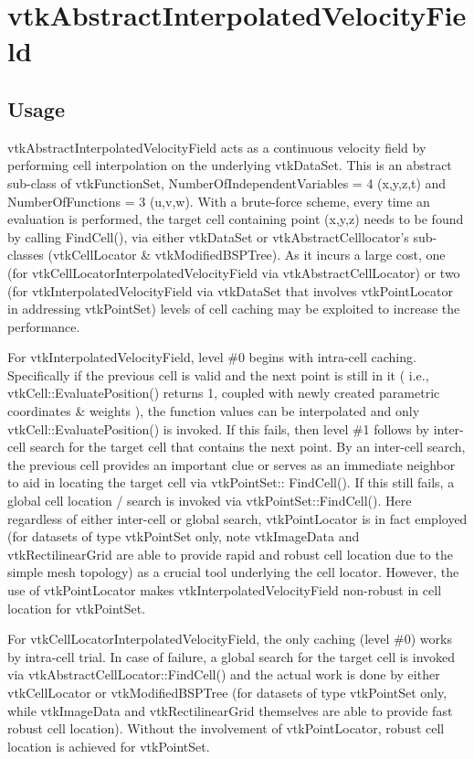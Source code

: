 \section{vtkAbstractInterpolatedVelocityField}

\subsection{Usage}

  vtkAbstractInterpolatedVelocityField acts as a continuous velocity field
  by performing cell interpolation on the underlying vtkDataSet. This is an
  abstract sub-class of vtkFunctionSet, NumberOfIndependentVariables = 4
  (x,y,z,t) and NumberOfFunctions = 3 (u,v,w). With a brute-force scheme,
  every time an evaluation is performed, the target cell containing point 
  (x,y,z) needs to be found by calling FindCell(), via either vtkDataSet or
  vtkAbstractCelllocator's sub-classes (vtkCellLocator \& vtkModifiedBSPTree). 
  As it incurs a large cost, one (for vtkCellLocatorInterpolatedVelocityField
  via vtkAbstractCellLocator) or two (for vtkInterpolatedVelocityField via 
  vtkDataSet that involves vtkPointLocator in addressing vtkPointSet) levels
  of cell caching may be exploited to increase the performance.

  For vtkInterpolatedVelocityField, level \#0 begins with intra-cell caching. 
  Specifically if the previous cell is valid and the next point is still in
  it ( i.e., vtkCell::EvaluatePosition() returns 1, coupled with newly created 
  parametric coordinates \& weights ), the function values can be interpolated
  and only vtkCell::EvaluatePosition() is invoked. If this fails, then level \#1 
  follows by inter-cell search for the target cell that contains the next point. 
  By an inter-cell search, the previous cell provides an important clue or serves 
  as an immediate neighbor to aid in locating the target cell via vtkPointSet::
  FindCell(). If this still fails, a global cell location / search is invoked via
  vtkPointSet::FindCell(). Here regardless of either inter-cell or global search, 
  vtkPointLocator is in fact employed (for datasets of type vtkPointSet only, note
  vtkImageData and vtkRectilinearGrid are able to provide rapid and robust cell 
  location due to the simple mesh topology) as a crucial tool underlying the cell 
  locator. However, the use of vtkPointLocator makes vtkInterpolatedVelocityField 
  non-robust in cell location for vtkPointSet.
  
  For vtkCellLocatorInterpolatedVelocityField, the only caching (level \#0) works
  by intra-cell trial. In case of failure, a global search for the target cell is 
  invoked via vtkAbstractCellLocator::FindCell() and the actual work is done by 
  either vtkCellLocator or vtkModifiedBSPTree (for datasets of type vtkPointSet 
  only, while vtkImageData and vtkRectilinearGrid themselves are able to provide 
  fast robust cell location). Without the involvement of vtkPointLocator, robust 
  cell location is achieved for vtkPointSet. 


